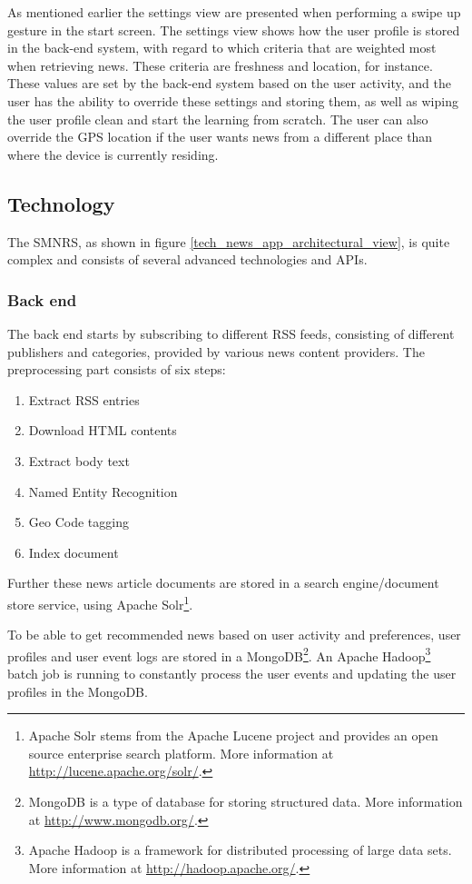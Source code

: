 As mentioned earlier the settings view are presented when performing a swipe up gesture in the start screen. The settings view shows how the user profile is stored in the back-end system, with regard to which criteria that are weighted most when retrieving news. These criteria are freshness and location, for instance. These values are set by the back-end system based on the user activity, and the user has the ability to override these settings and storing them, as well as wiping the user profile clean and start the learning from scratch. The user can also override the GPS location if the user wants news from a different place than where the device is currently residing.


\subsection{Technology}
The SMNRS, as shown in figure \ref{tech_news_app_architectural_view}, is quite complex and consists of several advanced technologies and APIs.

\subsubsection{Back end}
The back end starts by subscribing to different RSS feeds, consisting of different publishers and categories, provided by various news content providers. The preprocessing part consists of six steps:

\begin{enumerate}
	\item Extract RSS entries
	\item Download HTML contents
	\item Extract body text
	\item Named Entity Recognition
	\item Geo Code tagging
	\item Index document
\end{enumerate}

Further these news article documents are stored in a search engine/document store service, using Apache Solr\footnote{Apache Solr stems from the Apache Lucene project and provides an open source enterprise search platform. More information at \url{http://lucene.apache.org/solr/}.}.

To be able to get recommended news based on user activity and preferences, user profiles and user event logs are stored in a MongoDB\footnote{MongoDB is a type of database for storing structured data. More information at \url{http://www.mongodb.org/}.}. An Apache Hadoop\footnote{Apache Hadoop is a framework for distributed processing of large data sets. More information at \url{http://hadoop.apache.org/}.} batch job is running to constantly process the user events and updating the user profiles in the MongoDB.

